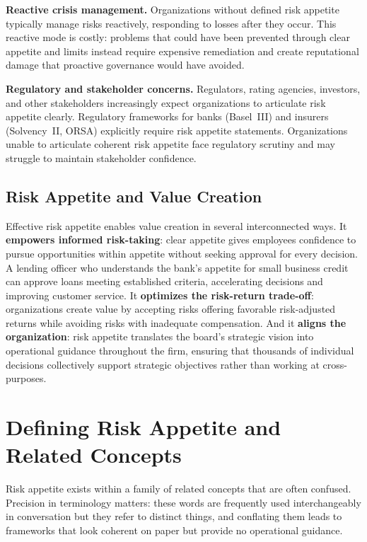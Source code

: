 \documentclass[11pt,openany]{book}
\begin{document}
\textbf{Reactive crisis management.} Organizations without defined risk appetite
typically manage risks reactively, responding to losses after they occur. This
reactive mode is costly: problems that could have been prevented through clear
appetite and limits instead require expensive remediation and create reputational
damage that proactive governance would have avoided.

\textbf{Regulatory and stakeholder concerns.} Regulators, rating agencies,
investors, and other stakeholders increasingly expect organizations to articulate
risk appetite clearly. Regulatory frameworks for banks (Basel~III) and insurers
(Solvency~II, ORSA) explicitly require risk appetite statements. Organizations
unable to articulate coherent risk appetite face regulatory scrutiny and may
struggle to maintain stakeholder confidence.

\subsection{Risk Appetite and Value Creation}
\label{subsec:appetite-value-creation}

Effective risk appetite enables value creation in several interconnected ways.
It \textbf{empowers informed risk-taking}: clear appetite gives employees
confidence to pursue opportunities within appetite without seeking approval for
every decision. A lending officer who understands the bank's appetite for small
business credit can approve loans meeting established criteria, accelerating
decisions and improving customer service. It \textbf{optimizes the risk-return
trade-off}: organizations create value by accepting risks offering favorable
risk-adjusted returns while avoiding risks with inadequate compensation. And it
\textbf{aligns the organization}: risk appetite translates the board's strategic
vision into operational guidance throughout the firm, ensuring that thousands of
individual decisions collectively support strategic objectives rather than
working at cross-purposes.

\section{Defining Risk Appetite and Related Concepts}
\label{sec:defining-appetite}

Risk appetite exists within a family of related concepts that are often
confused. Precision in terminology matters: these words are frequently used
interchangeably in conversation but they refer to distinct things, and
conflating them leads to frameworks that look coherent on paper but provide no
operational guidance.
\end{document}
